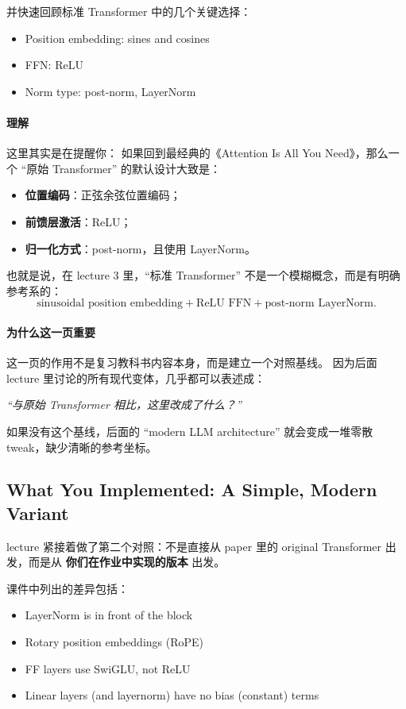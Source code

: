 \documentclass[a4paper,UTF8]{article}
\numberwithin{equation}{section}
\begin{document}
并快速回顾标准 Transformer 中的几个关键选择：
\begin{itemize}
    \item Position embedding: sines and cosines
    \item FFN: ReLU
    \item Norm type: post-norm, LayerNorm
\end{itemize}

\paragraph{理解}
这里其实是在提醒你：  
如果回到最经典的《Attention Is All You Need》，那么一个 ``原始 Transformer'' 的默认设计大致是：
\begin{itemize}
    \item \textbf{位置编码}：正弦余弦位置编码；
    \item \textbf{前馈层激活}：ReLU；
    \item \textbf{归一化方式}：post-norm，且使用 LayerNorm。
\end{itemize}

也就是说，在 lecture 3 里，``标准 Transformer'' 不是一个模糊概念，而是有明确参考系的：
\[
\text{sinusoidal position embedding} + \text{ReLU FFN} + \text{post-norm LayerNorm}.
\]

\paragraph{为什么这一页重要}
这一页的作用不是复习教科书内容本身，而是建立一个对照基线。  
因为后面 lecture 里讨论的所有现代变体，几乎都可以表述成：

\begin{center}
\emph{“与原始 Transformer 相比，这里改成了什么？”}
\end{center}

如果没有这个基线，后面的 ``modern LLM architecture'' 就会变成一堆零散 tweak，缺少清晰的参考坐标。

\subsection{What You Implemented: A Simple, Modern Variant}

lecture 紧接着做了第二个对照：不是直接从 paper 里的 original Transformer 出发，而是从 \textbf{你们在作业中实现的版本} 出发。

课件中列出的差异包括：
\begin{itemize}
    \item LayerNorm is in front of the block
    \item Rotary position embeddings (RoPE)
    \item FF layers use SwiGLU, not ReLU
    \item Linear layers (and layernorm) have no bias (constant) terms
\end{itemize}
\end{document}
